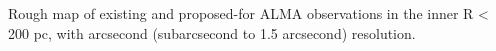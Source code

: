 Rough map of existing and proposed-for ALMA observations in the inner R < 200 pc, with arcsecond (subarcsecond to 1.5 arcsecond) resolution.